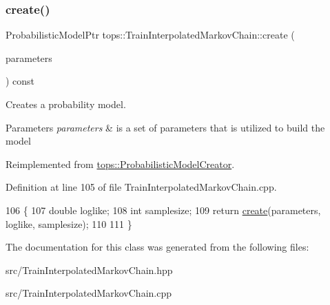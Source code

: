 \subsubsection{\texorpdfstring{create()}{create()}}
{\footnotesize\ttfamily Probabilistic\+Model\+Ptr tops\+::\+Train\+Interpolated\+Markov\+Chain\+::create (\begin{DoxyParamCaption}\item[{\hyperlink{classtops_1_1ProbabilisticModelParameters}{Probabilistic\+Model\+Parameters} \&}]{parameters }\end{DoxyParamCaption}) const\hspace{0.3cm}{\ttfamily [virtual]}}



Creates a probability model. 


\begin{DoxyParams}{Parameters}
{\em parameters} & is a set of parameters that is utilized to build the model \\
\hline
\end{DoxyParams}


Reimplemented from \hyperlink{classtops_1_1ProbabilisticModelCreator_afed6c8ffa45fff446bdaa8b533da8f7c}{tops\+::\+Probabilistic\+Model\+Creator}.



Definition at line 105 of file Train\+Interpolated\+Markov\+Chain.\+cpp.


\begin{DoxyCode}
106                                                                  \{
107         \textcolor{keywordtype}{double} loglike;
108         \textcolor{keywordtype}{int} samplesize;
109         \textcolor{keywordflow}{return} \hyperlink{classtops_1_1TrainInterpolatedMarkovChain_aecbe1110e2a9c7479340b39e3d3c55ef}{create}(parameters, loglike, samplesize);
110 
111 \}
\end{DoxyCode}


The documentation for this class was generated from the following files\+:\begin{DoxyCompactItemize}
\item 
src/Train\+Interpolated\+Markov\+Chain.\+hpp\item 
src/Train\+Interpolated\+Markov\+Chain.\+cpp\end{DoxyCompactItemize}
